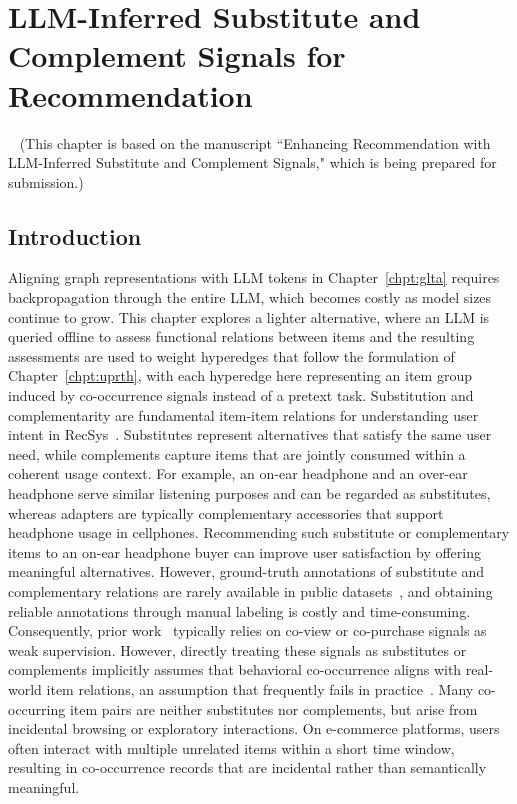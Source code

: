 \chapter{LLM-Inferred Substitute and Complement Signals for Recommendation}~\label{chpt:erlsc}
(This chapter is based on the manuscript ``Enhancing Recommendation with LLM-Inferred Substitute and Complement Signals," which is being prepared for submission.)

\section{Introduction}
Aligning graph representations with LLM tokens in Chapter~\ref{chpt:glta} requires backpropagation through the entire LLM, which becomes costly as model sizes continue to grow. This chapter explores a lighter alternative, where an LLM is queried offline to assess functional relations between items and the resulting assessments are used to weight hyperedges that follow the formulation of Chapter~\ref{chpt:uprth}, with each hyperedge here representing an item group induced by co-occurrence signals instead of a pretext task.
Substitution and complementarity are fundamental item-item relations for understanding user intent in RecSys~\cite{subcom22, subcom23}. Substitutes represent alternatives that satisfy the same user need, while complements capture items that are jointly consumed within a coherent usage context. 
For example, an on-ear headphone and an over-ear headphone serve similar listening purposes and can be regarded as substitutes, whereas adapters are typically complementary accessories that support headphone usage in cellphones. Recommending such substitute or complementary items to an on-ear headphone buyer can improve user satisfaction by offering meaningful alternatives. 
However, ground-truth annotations of substitute and complementary relations are rarely available in public datasets~\cite{dataset:amazon, xmarket}, and obtaining reliable annotations through manual labeling is costly and time-consuming. Consequently, prior work~\cite{sclabel20chen, sclabel20liu, sclabel20xu} typically relies on co-view or co-purchase signals as weak supervision. However, directly treating these signals as substitutes or complements implicitly assumes that behavioral co-occurrence aligns with real-world item relations, an assumption that frequently fails in practice~\cite{notrealsc22tong, notrealsc23ye, notrealsc24kai}. Many co-occurring item pairs are neither substitutes nor complements, but arise from incidental browsing or exploratory interactions. On e-commerce platforms, users often interact with multiple unrelated items within a short time window, resulting in co-occurrence records that are incidental rather than semantically meaningful.

